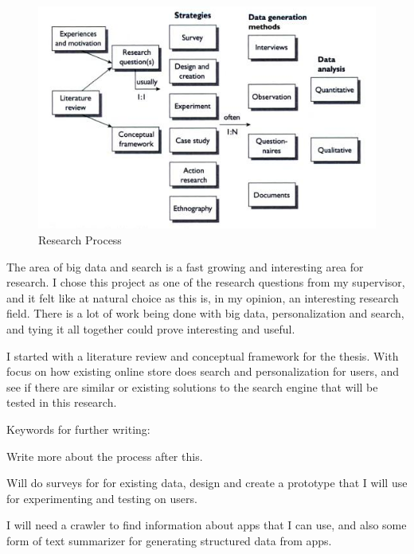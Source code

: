   \begin{figure}
    \vspace{-20pt}
    \begin{center}
      \includegraphics[scale=0.5]{ResearchProcess.png}
    \end{center}
    \vspace{-5pt}
    \caption{Research Process \cite{empiriske}}
  \end{figure}

  The area of big data and search is a fast growing and interesting area for research. I chose this project as one of the research questions from my supervisor, and it felt like at natural choice as this is, in my opinion, an interesting research field. There is a lot of work being done with big data, personalization and search, and tying it all together could prove interesting and useful.

  I started with a literature review and conceptual framework for the thesis. With focus on how existing online store does search and personalization for users, and see if there are similar or existing solutions to the search engine that will be tested in this research.

  Keywords for further writing:

  Write more about the process after this.

  Will do surveys for for existing data, design and create a prototype that I will use for experimenting and testing on users.

  I will need a crawler to find information about apps that I can use, and also some form of text summarizer for generating structured data from apps.

